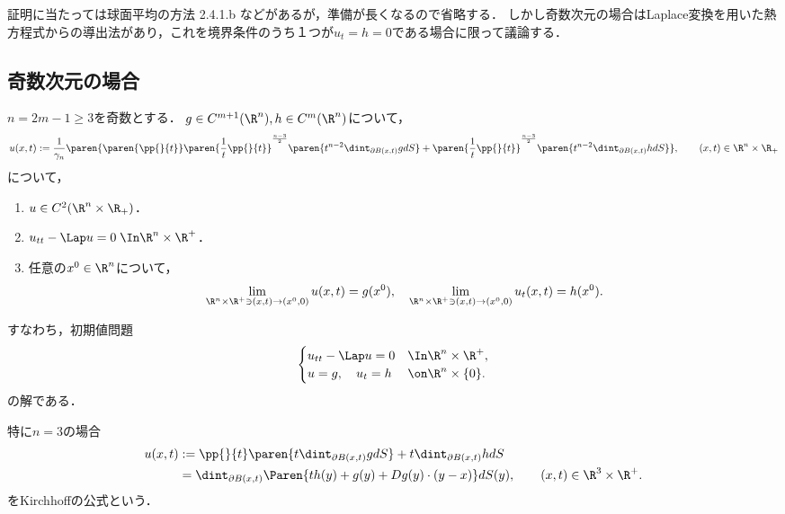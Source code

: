 \documentclass[uplatex,dvipdfmx]{jsreport}
\begin{document}
\begin{tcolorbox}[colframe=ForestGreen, colback=ForestGreen!10!white,breakable,colbacktitle=ForestGreen!40!white,coltitle=black,fonttitle=\bfseries\sffamily,
title=]
    証明に当たっては球面平均の方法\cite{Evans} 2.4.1.b などがあるが，準備が長くなるので省略する．
    しかし奇数次元の場合はLaplace変換を用いた熱方程式からの導出法があり，これを境界条件のうち１つが$u_t=h=0$である場合に限って議論する．
\end{tcolorbox}

\subsection{奇数次元の場合}

\begin{theorem}\label{thm-C-WE-in-odd-dimension}
    $n=2m-1\ge3$を奇数とする．
    $g\in C^{m+1}(\R^n),h\in C^m(\R^n)$について，
    \[u(x,t):=\frac{1}{\gamma_n}\paren{\paren{\pp{}{t}}\paren{\frac{1}{t}\pp{}{t}}^{\frac{n-3}{2}}\paren{t^{n-2}\dint_{\partial B(x,t)}gdS}+\paren{\frac{1}{t}\pp{}{t}}^{\frac{n-3}{2}}\paren{t^{n-2}\dint_{\partial B(x,t)}hdS}},\qquad(x,t)\in\R^n\times\R_+\]
    について，
    \begin{enumerate}
        \item $u\in C^2(\R^n\times\R_+)$．
        \item $u_{tt}-\Lap u=0\;\In\R^n\times\R^+$．
        \item 任意の$x^0\in\R^n$について，
        \[\lim_{\R^n\times\R^+\ni(x,t)\to(x^0,0)}u(x,t)=g(x^0),\quad\lim_{\R^n\times\R^+\ni(x,t)\to(x^0,0)}u_t(x,t)=h(x^0).\]
    \end{enumerate}
    すなわち，初期値問題
    \[\begin{cases}
        u_{tt}-\Lap u=0&\In\R^n\times\R^+,\\
        u=g,\quad u_t=h&\on\R^n\times\{0\}.
    \end{cases}\]
    の解である．
\end{theorem}
\begin{remark}
    特に$n=3$の場合
    \begin{align*}
        u(x,t)&:=\pp{}{t}\paren{t\dint_{\partial B(x,t)}gdS}+t\dint_{\partial B(x,t)}hdS\\
        &=\dint_{\partial B(x,t)}\Paren{th(y)+g(y)+Dg(y)\cdot(y-x)}dS(y),\qquad (x,t)\in\R^3\times\R^+.
    \end{align*}
    をKirchhoffの公式という．
\end{remark}
\end{document}
